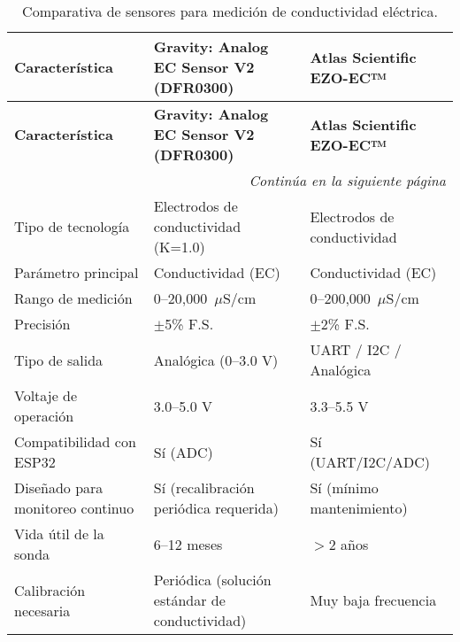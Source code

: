 \renewcommand{\arraystretch}{1.5}
\begin{longtable}{
    |p{4cm}
    |p{5cm}
    |p{5cm}|
}
\caption{Comparativa de sensores para medición de conductividad eléctrica.}
\label{tab:sensor_conductividad} \\
\hline
\textbf{Característica} 
    & \textbf{Gravity: Analog EC Sensor V2 (DFR0300) \cite{DFRobot_EC_Sensor}} 
    & \textbf{Atlas Scientific EZO-EC™ \cite{AtlasScientific_Conductivity}} \\ 
\hline
\endfirsthead

\hline
\textbf{Característica} 
    & \textbf{Gravity: Analog EC Sensor V2 (DFR0300) \cite{DFRobot_EC_Sensor}} 
    & \textbf{Atlas Scientific EZO-EC™ \cite{AtlasScientific_Conductivity}} \\ 
\hline
\endhead

\hline
\multicolumn{3}{r}{\textit{Continúa en la siguiente página}} \\
\endfoot

\hline
\endlastfoot

Tipo de tecnología 
    & Electrodos de conductividad (K=1.0) 
    & Electrodos de conductividad \\ \hline

Parámetro principal 
    & Conductividad (EC) 
    & Conductividad (EC) \\ \hline

Rango de medición 
    & 0--20,000~$\mu$S/cm 
    & 0--200,000~$\mu$S/cm \\ \hline

Precisión 
    & $\pm$5\% F.S. 
    & $\pm$2\% F.S. \\ \hline

Tipo de salida 
    & Analógica (0--3.0 V) 
    & UART / I2C / Analógica \\ \hline

Voltaje de operación 
    & 3.0--5.0 V 
    & 3.3--5.5 V \\ \hline

Compatibilidad con ESP32 
    & Sí (ADC) 
    & Sí (UART/I2C/ADC) \\ \hline

Diseñado para monitoreo continuo 
    & Sí (recalibración periódica requerida) 
    & Sí (mínimo mantenimiento) \\ \hline

Vida útil de la sonda 
    & 6--12 meses 
    & $>$2 años \\ \hline

Calibración necesaria 
    & Periódica (solución estándar de conductividad) 
    & Muy baja frecuencia \\ \hline


\end{longtable}
